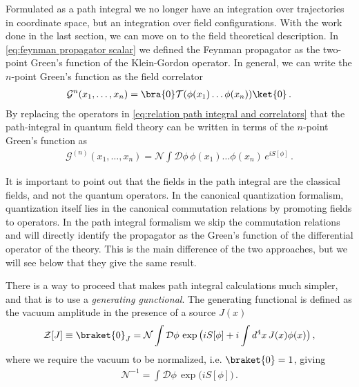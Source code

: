 Formulated as a path integral we no longer have an integration over trajectories in coordinate space, but an integration over field configurations. With the work done in the last section, we can move on to the field theoretical description. In \cref{eq:feynman propagator scalar} we defined the Feynman propagator as the two-point Green's function of the Klein-Gordon operator. In general, we can write the $n$-point Green's function as the field correlator
\begin{align}\label{eq:n-point Green's function}
    \mathcal{G}^{n}(x_1,\dots,x_n)=\bra{0}\mathcal{T}(\phi(x_1)\dots\phi(x_n))\ket{0}\,.
\end{align}
By replacing the operators in \cref{eq:relation path integral and correlators} that the path-integral in quantum field theory can be written in terms of the $n$-point Green's function as 
\begin{align}\label{eq:n-point Green's function as path integral}
    \mathcal{G}^{(n)}(x_1,\dots,x_n)=\mathcal{N}\int\mathcal{D}\phi \,\phi(x_1)\dots\phi(x_n)\,e^{iS[\phi]}\,.
\end{align}

It is important to point out that the fields in the path integral are the classical fields, and not the quantum operators. In the canonical quantization formalism, quantization itself lies in the canonical commutation relations by promoting fields to operators. In the path integral formalism we skip the commutation relations and will directly identify the propagator as the Green's function of the differential operator of the theory. This is the main difference of the two approaches, but we will see below that they give the same result.

There is a way to proceed that makes path integral calculations much simpler, and that is to use a \emph{generating gunctional}. The generating functional is defined as the vacuum amplitude in the presence of a source $J(x)$
\begin{align}
    \mathcal{Z}[J]\equiv\braket{0}_{J}=\mathcal{N}\int\mathcal{D}\phi\,\exp\big(iS[\phi]+i\int d^{4}x\,J(x)\phi(x)\big)\,,
\end{align}
where we require the vacuum to be normalized, i.e. $\braket{0}=1$, giving
\begin{align}
    \mathcal{N}^{-1}=\int\mathcal{D}\phi\,\exp\big(iS[\phi]\big)\,.
\end{align}

